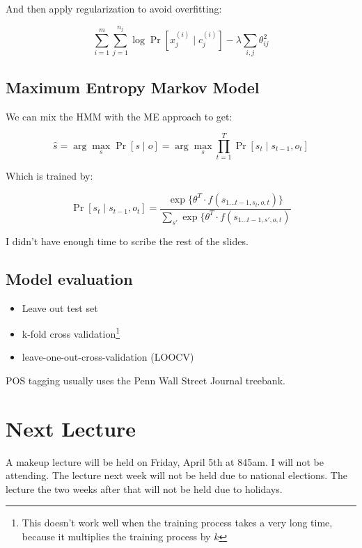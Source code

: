 \documentclass{idc_msc}
\begin{document}
And then apply regularization to avoid overfitting:

\[
  \sum_{i = 1}^m \sum_{j = 1}^{n_j} \log\Pr[x_j^{(i)} \mid c_j^{(i)}] - \lambda \sum_{i,j} \theta_{ij}^2
\]

\subsection{Maximum Entropy Markov Model}

We can mix the HMM with the ME approach to get:

\[
  \hat{s} = \arg\max_s \Pr[s \mid o] = \arg\max_s \prod_{t=1}^T \Pr[s_t \mid s_{t-1}, o_t]
\]

Which is trained by:

\[
  \Pr[s_t \mid s_{t-1}, o_t] = \frac{\exp\{\theta^T \cdot f(s_{1\ldots t-1, s_t, o, t})\}}{\sum_{s'}\exp\{\theta^T \cdot f(s_{1\ldots t-1, s', o, t})}
\]

I didn't have enough time to scribe the rest of the slides.

\subsection{Model evaluation}

\begin{itemize}
  \item Leave out test set
  \item k-fold cross validation\footnote{This doesn't work well when the training process takes a very long time, because it multiplies the training process by \(k\)}
  \item leave-one-out-cross-validation (LOOCV)
\end{itemize}

POS tagging usually uses the Penn Wall Street Journal treebank.

\section{Next Lecture}

A makeup lecture will be held on Friday, April 5th at 845am.
I will not be attending.
The lecture next week will not be held due to national elections.
The lecture the two weeks after that will not be held due to holidays.
\end{document}
